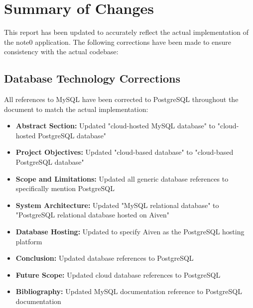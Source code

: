\documentclass[12pt, a4paper]{report}
\begin{document}
    
    
    
    
    

\chapter*{Summary of Changes}

This report has been updated to accurately reflect the actual implementation of the note0 application. The following corrections have been made to ensure consistency with the actual codebase:

\section{Database Technology Corrections}
All references to MySQL have been corrected to PostgreSQL throughout the document to match the actual implementation:

\begin{itemize}
    \item \textbf{Abstract Section:} Updated "cloud-hosted MySQL database" to "cloud-hosted PostgreSQL database"
    \item \textbf{Project Objectives:} Updated "cloud-based database" to "cloud-based PostgreSQL database"
    \item \textbf{Scope and Limitations:} Updated all generic database references to specifically mention PostgreSQL
    \item \textbf{System Architecture:} Updated "MySQL relational database" to "PostgreSQL relational database hosted on Aiven"
    \item \textbf{Database Hosting:} Updated to specify Aiven as the PostgreSQL hosting platform
    \item \textbf{Conclusion:} Updated database references to PostgreSQL
    \item \textbf{Future Scope:} Updated cloud database references to PostgreSQL
    \item \textbf{Bibliography:} Updated MySQL documentation reference to PostgreSQL documentation
\end{itemize}
\end{document}

